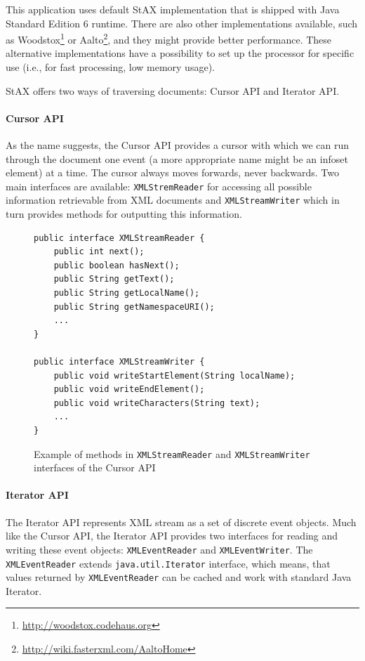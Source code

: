 \documentclass[11pt,oneside,final]{fithesis2}
\begin{document}
This application uses default StAX implementation that is shipped with Java Standard Edition 6 runtime. There are also other implementations available, such as Woodstox\footnote{\url{http://woodstox.codehaus.org}} or Aalto\footnote{\url{http://wiki.fasterxml.com/AaltoHome}}, and they might provide better performance. These alternative implementations have a possibility to set up the processor for specific use (i.e., for fast processing, low memory usage). 

StAX offers two ways of traversing documents: Cursor API and Iterator API. 

\paragraph*{Cursor API} As the name suggests, the Cursor API provides a cursor with which we can run through the document one event (a more appropriate name might be an infoset element) at a time. The cursor always moves forwards, never backwards. Two main interfaces are available: \texttt{XMLStremReader} for accessing all possible information retrievable from XML documents and \texttt{XMLStreamWriter} which in turn provides methods for outputting this information. 

\begin{figure}[!ht]
\begin{lstlisting}
public interface XMLStreamReader {
	public int next();
   	public boolean hasNext();
   	public String getText();		
  	public String getLocalName();
  	public String getNamespaceURI();
  	...
} 

public interface XMLStreamWriter {
  	public void writeStartElement(String localName);
  	public void writeEndElement();
 	public void writeCharacters(String text);
	... 
}
\end{lstlisting}
\caption{Example of methods in \texttt{XMLStreamReader} and \texttt{XMLStreamWriter} interfaces of the Cursor API}
\label{fig:staxcursorapi}
\end{figure}

\paragraph*{Iterator API} The Iterator API represents XML stream as a set of discrete event objects. Much like the Cursor API, the Iterator API provides two interfaces for reading and writing these event objects: \texttt{XMLEventReader} and \texttt{XMLEventWriter}. The \texttt{XMLEventReader} extends \texttt{java.util.Iterator} interface, which means, that values returned by \texttt{XMLEventReader} can be cached and work with standard Java Iterator.
\end{document}
